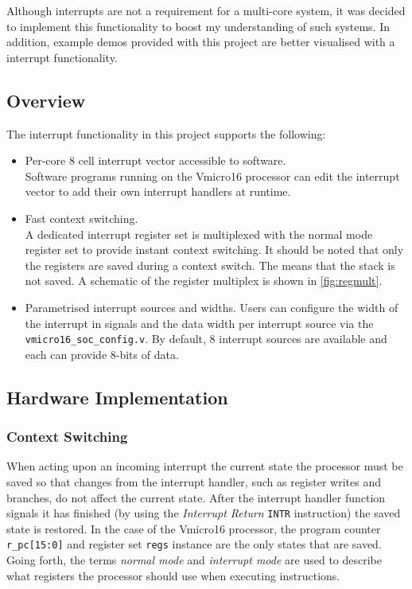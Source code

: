 Although interrupts are not a requirement for a multi-core system, it was decided to implement this functionality to boost my understanding of such systems. In addition, example demos provided with this project are better visualised with a interrupt functionality.

\subsection{Overview}
The interrupt functionality in this project supports the following:
\begin{itemize}
\item Per-core 8 cell interrupt vector accessible to software.\\
Software programs running on the Vmicro16 processor can edit the interrupt vector to add their own interrupt handlers at runtime.

\item Fast context switching.\\
A dedicated interrupt register set is multiplexed with the normal mode register set to provide instant context switching. It should be noted that only the registers are saved during a context switch. The means that the stack is not saved. A schematic of the register multiplex is shown in \cref{fig:regmult}.

\item Parametrised interrupt sources and widths. Users can configure the width of the interrupt in signals and the data width per interrupt source via the \verb|vmicro16_soc_config.v|. By default, 8 interrupt sources are available and each can provide 8-bits of data.
\end{itemize}

\subsection{Hardware Implementation}

\subsubsection{Context Switching}
When acting upon an incoming interrupt the current state the processor must be saved so that changes from the interrupt handler, such as register writes and branches, do not affect the current state. After the interrupt handler function signals it has finished (by using the \textit{Interrupt Return} \verb|INTR| instruction) the saved state is restored.
In the case of the Vmicro16 processor, the program counter \verb|r_pc[15:0]| and register set \verb|regs| instance are the only states that are saved. Going forth, the terms \textit{normal mode} and \textit{interrupt mode} are used to describe what registers the processor should use when executing instructions.

